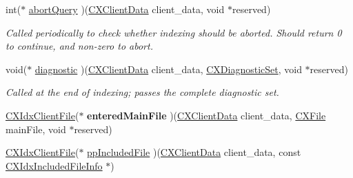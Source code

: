 \begin{DoxyCompactItemize}
\item 
\mbox{\label{structIndexerCallbacks_ace0bc034aefe283f15e2993aa8b19c2c}} 
int($\ast$ \mbox{\hyperlink{structIndexerCallbacks_ace0bc034aefe283f15e2993aa8b19c2c}{abort\+Query}} )(\mbox{\hyperlink{group__CINDEX_gacfa40c3de26d228c0d898403c2c21612}{C\+X\+Client\+Data}} client\+\_\+data, void $\ast$reserved)
\begin{DoxyCompactList}\small\item\em Called periodically to check whether indexing should be aborted. Should return 0 to continue, and non-\/zero to abort. \end{DoxyCompactList}\item 
\mbox{\label{structIndexerCallbacks_a042adb7450edd0f76d3f715d52c5b7ba}} 
void($\ast$ \mbox{\hyperlink{structIndexerCallbacks_a042adb7450edd0f76d3f715d52c5b7ba}{diagnostic}} )(\mbox{\hyperlink{group__CINDEX_gacfa40c3de26d228c0d898403c2c21612}{C\+X\+Client\+Data}} client\+\_\+data, \mbox{\hyperlink{group__CINDEX__DIAG_ga38dfc0ae45b55bf7fd577eed9148e244}{C\+X\+Diagnostic\+Set}}, void $\ast$reserved)
\begin{DoxyCompactList}\small\item\em Called at the end of indexing; passes the complete diagnostic set. \end{DoxyCompactList}\item 
\mbox{\label{structIndexerCallbacks_aaaf536b76953e8880fd5eaeb6182e296}} 
\mbox{\hyperlink{group__CINDEX__HIGH_ga6fd9c59c0b0a0a21622e5bcfc08156cc}{C\+X\+Idx\+Client\+File}}($\ast$ {\bfseries entered\+Main\+File} )(\mbox{\hyperlink{group__CINDEX_gacfa40c3de26d228c0d898403c2c21612}{C\+X\+Client\+Data}} client\+\_\+data, \mbox{\hyperlink{group__CINDEX__FILES_gacfcea9c1239c916597e2e5b3e109215a}{C\+X\+File}} main\+File, void $\ast$reserved)
\item 
\mbox{\label{structIndexerCallbacks_ae102dccc8b906641423c0ac66ec8f3e3}} 
\mbox{\hyperlink{group__CINDEX__HIGH_ga6fd9c59c0b0a0a21622e5bcfc08156cc}{C\+X\+Idx\+Client\+File}}($\ast$ \mbox{\hyperlink{structIndexerCallbacks_ae102dccc8b906641423c0ac66ec8f3e3}{pp\+Included\+File}} )(\mbox{\hyperlink{group__CINDEX_gacfa40c3de26d228c0d898403c2c21612}{C\+X\+Client\+Data}} client\+\_\+data, const \mbox{\hyperlink{structCXIdxIncludedFileInfo}{C\+X\+Idx\+Included\+File\+Info}} $\ast$)

\end{DoxyCompactItemize}
